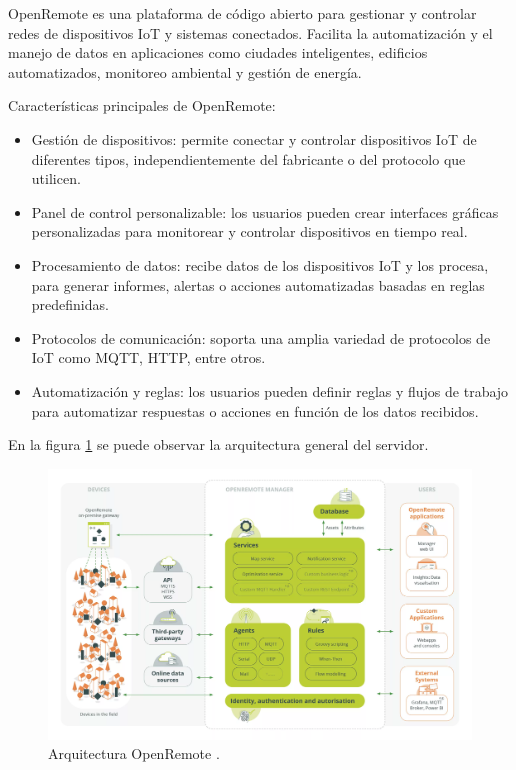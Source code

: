 OpenRemote \citep{openremote} \citep{docsopenremote} es una plataforma de código abierto para gestionar y controlar redes de dispositivos IoT y sistemas conectados. Facilita la automatización y el manejo de datos en aplicaciones como ciudades inteligentes, edificios automatizados, monitoreo ambiental y gestión de energía.

Características principales de OpenRemote:

\begin{itemize}
	\item Gestión de dispositivos: permite conectar y controlar dispositivos IoT de diferentes tipos, independientemente del fabricante o del protocolo que utilicen.
	\item Panel de control personalizable: los usuarios pueden crear interfaces gráficas personalizadas para monitorear y controlar dispositivos en tiempo real.
	\item Procesamiento de datos: recibe datos de los dispositivos IoT y los procesa, para generar informes, alertas o acciones automatizadas basadas en reglas predefinidas.
	\item Protocolos de comunicación: soporta una amplia variedad de protocolos de IoT como MQTT, HTTP, entre otros.
	\item Automatización y reglas: los usuarios pueden definir reglas y flujos de trabajo para automatizar respuestas o acciones en función de los datos recibidos.
\end{itemize}

En la figura \ref{fig:arqopremote} se puede observar la arquitectura general del servidor.

\begin{figure}[H]
    \centering
    \includegraphics[width=1.2\textwidth]{./Figures/arq_or.jpg}
    \caption{Arquitectura OpenRemote \citep{docsopenremote}.}
    \label{fig:arqopremote}
\end{figure}





